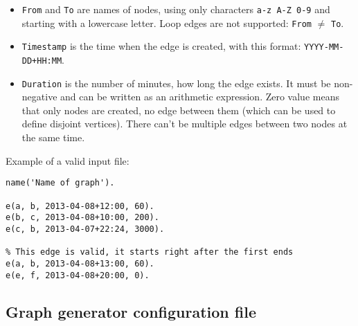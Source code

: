\documentclass[11pt, a4paper]{article}
\newcommand{\pl}[1]{\texttt{#1}} %
\theoremstyle{plain}
\theoremstyle{definition}
\theoremstyle{remark}
\begin{document}
\begin{itemize}
	\item \pl{From} and \pl{To} are names of nodes, using only characters \texttt{a-z A-Z 0-9}
		and starting with a lowercase letter.	
		Loop edges are not supported: \pl{From} $\ne$ \pl{To}.
	\item \pl{Timestamp} is the time when the edge is created,
		with this format: \pl{YYYY-MM-DD+HH:MM}.
	\item \pl{Duration} is the number of minutes, how long the edge exists. It must be non-negative
		and can be written as an arithmetic expression.
		Zero value means that only nodes are created, no edge between them (which
        can be used to define disjoint vertices).
		There can't be multiple edges between two nodes at the same time.
\end{itemize}
Example of a valid input file:
\begin{verbatim}
name('Name of graph').

e(a, b, 2013-04-08+12:00, 60).
e(b, c, 2013-04-08+10:00, 200).
e(c, b, 2013-04-07+22:24, 3000).

% This edge is valid, it starts right after the first ends
e(a, b, 2013-04-08+13:00, 60).
e(e, f, 2013-04-08+20:00, 0).

\end{verbatim}

\subsection{Graph generator configuration file}
\label{sec:files-generator}
\end{document}
